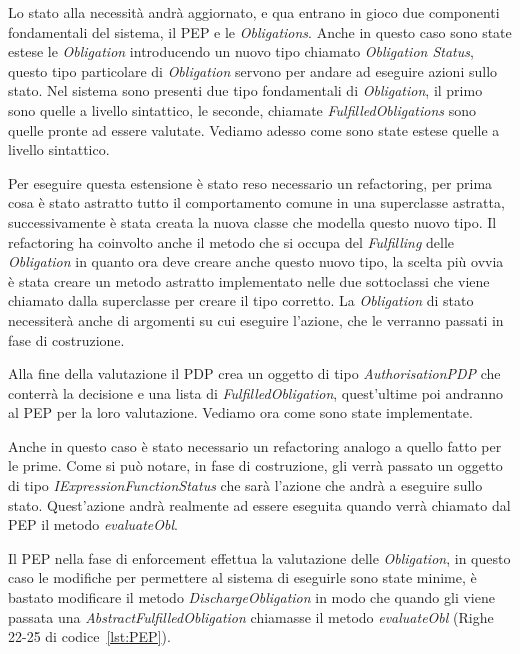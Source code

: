 Lo stato alla necessità andrà aggiornato, e qua entrano in gioco due componenti fondamentali del sistema, il PEP e le \textit{Obligations}. 
Anche in questo caso sono state estese le \textit{Obligation} introducendo un nuovo tipo chiamato \textit{Obligation Status}, questo tipo particolare di \textit{Obligation} servono per andare ad eseguire azioni sullo stato.
Nel sistema sono presenti due tipo fondamentali di \textit{Obligation}, il primo sono quelle a livello sintattico, le seconde, chiamate \textit{FulfilledObligations} sono quelle pronte ad essere valutate. Vediamo adesso come sono state estese quelle a livello sintattico.\\ \par
Per eseguire questa estensione è stato reso necessario un refactoring, per prima cosa è stato astratto tutto il comportamento comune in una superclasse astratta, successivamente è stata creata la nuova classe che modella questo nuovo tipo.
Il refactoring ha coinvolto anche il metodo che si occupa del \textit{Fulfilling} delle \textit{Obligation} in quanto ora deve creare anche questo nuovo tipo, la scelta più ovvia è stata creare un metodo astratto implementato nelle due sottoclassi che viene chiamato dalla superclasse per creare il tipo corretto.
La \textit{Obligation} di stato necessiterà anche di argomenti su cui eseguire l'azione, che le verranno passati in fase di costruzione.\\ \par
Alla fine della valutazione il PDP crea un oggetto di tipo \textit{AuthorisationPDP} che conterrà la decisione e una lista di \textit{FulfilledObligation}, quest'ultime poi andranno al PEP per la loro valutazione. Vediamo ora come sono state implementate.\\ \par
Anche in questo caso è stato necessario un refactoring analogo a quello fatto per le prime.
Come si può notare, in fase di costruzione, gli verrà passato un oggetto di tipo \textit{IExpressionFunctionStatus} che sarà l'azione che andrà a eseguire sullo stato. Quest'azione andrà realmente ad essere eseguita quando verrà chiamato dal PEP il metodo \textit{evaluateObl}.\\ \par
Il PEP nella fase di enforcement effettua la valutazione delle \textit{Obligation}, in questo caso le modifiche per permettere al sistema di eseguirle sono state minime, è bastato modificare il metodo \textit{DischargeObligation} in modo che quando gli viene passata una \textit{AbstractFulfilledObligation} chiamasse il metodo \textit{evaluateObl} (Righe 22-25 di codice~\ref{lst:PEP}).


